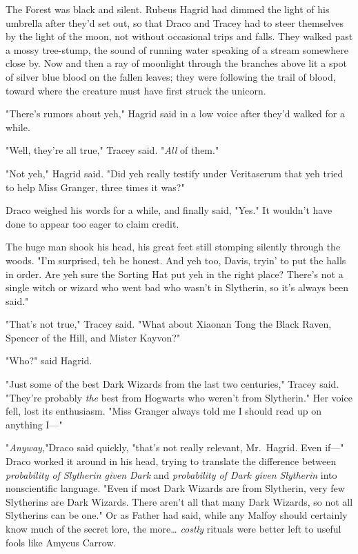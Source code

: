 The Forest was black and silent. Rubeus Hagrid had dimmed the light of his 
umbrella after they'd set out, so that Draco and Tracey had to steer themselves 
by the light of the moon, not without occasional trips and falls. They walked 
past a mossy tree-stump, the sound of running water speaking of a stream 
somewhere close by. Now and then a ray of moonlight through the branches above 
lit a spot of silver blue blood on the fallen leaves; they were following the 
trail of blood, toward where the creature must have first struck the unicorn.

"There's rumors about yeh," Hagrid said in a low voice after they'd walked for 
a while.

"Well, they're all true," Tracey said. "\emph{All} of them."

"Not yeh," Hagrid said. "Did yeh really testify under Veritaserum that yeh 
tried to help Miss Granger, three times it was?"

Draco weighed his words for a while, and finally said, "Yes." It wouldn't have 
done to appear too eager to claim credit.

The huge man shook his head, his great feet still stomping silently through the 
woods. "I'm surprised, teh be honest. And yeh too, Davis, tryin' to put the 
halls in order. Are yeh sure the Sorting Hat put yeh in the right place? 
There's not a single witch or wizard who went bad who wasn't in Slytherin, so 
it's always been said."

"That's not true," Tracey said. "What about Xiaonan Tong the Black Raven, 
Spencer of the Hill, and Mister Kayvon?"

"Who?" said Hagrid.

"Just some of the best Dark Wizards from the last two centuries," Tracey said. 
"They're probably \emph{the} best from Hogwarts who weren't from Slytherin." 
Her voice fell, lost its enthusiasm. "Miss Granger always told me I should read 
up on anything I---"

"\emph{Anyway,}"Draco said quickly, "that's not really relevant, Mr.~Hagrid. 
Even if---" Draco worked it around in his head, trying to translate the 
difference between \emph{probability of Slytherin given Dark} and 
\emph{probability of Dark given Slytherin} into nonscientific language. "Even 
if most Dark Wizards are from Slytherin, very few Slytherins are Dark Wizards. 
There aren't all that many Dark Wizards, so not all Slytherins can be one." Or 
as Father had said, while any Malfoy should certainly know much of the secret 
lore, the more{\ldots} \emph{costly} rituals were better left to useful fools 
like Amycus Carrow.

